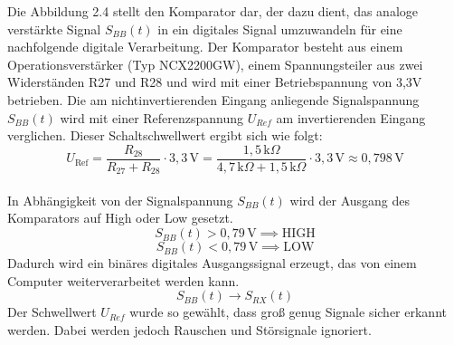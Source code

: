 Die Abbildung 2.4 stellt den Komparator dar, der dazu dient, das analoge verstärkte Signal $S_{BB}(t)$ in ein digitales Signal umzuwandeln für
eine nachfolgende digitale Verarbeitung. Der Komparator besteht aus einem Operationsverstärker (Typ NCX2200GW), einem Spannungsteiler aus zwei Widerständen
R27 und R28 und wird mit einer Betriebspannung von 3,3V betrieben. Die am nichtinvertierenden Eingang anliegende Signalspannung $S_{BB}(t)$ wird mit
einer Referenzspannung $U_{Ref}$ am invertierenden Eingang verglichen. Dieser Schaltschwellwert ergibt sich wie folgt:
\\
\begin{equation}
    U_{\text{Ref}} = \frac{R_{28}}{R_{27} + R_{28}} \cdot 3{,}3\,\text{V}
    = \frac{1{,}5\,\text{k}\Omega}{4{,}7\,\text{k}\Omega + 1{,}5\,\text{k}\Omega} \cdot 3{,}3\,\text{V}
    \approx 0{,}798\,\text{V}
\end{equation}\\
In Abhängigkeit von der Signalspannung $S_{BB}(t)$ wird der Ausgang des Komparators auf High oder Low gesetzt.
\[
S_{BB}(t) > 0{,}79\,\mathrm{V} \implies \text{HIGH}
\]
\[
S_{BB}(t) < 0{,}79\,\mathrm{V} \implies \text{LOW}
\]
Dadurch wird ein binäres digitales Ausgangssignal erzeugt, das von einem Computer weiterverarbeitet werden kann.
\[
S_{BB}(t) \rightarrow S_{RX}(t)
\]
Der Schwellwert $U_{Ref}$ wurde so gewählt, dass groß genug Signale sicher erkannt werden. Dabei werden jedoch Rauschen und Störsignale ignoriert.